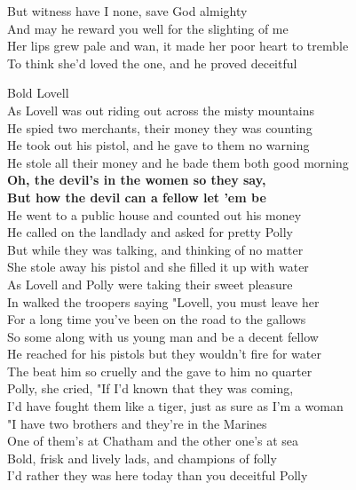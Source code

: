 \documentclass[letterpaper,9pt]{article}
\begin{document}
But witness have I none, save God almighty \\
And may he reward you well for the slighting of me \\
Her lips grew pale and wan, it made her poor heart to tremble \\
To think she'd loved the one, and he proved deceitful \\

\newpage
{}
\Huge
Bold Lovell\\

\Large
As Lovell was out riding out across the misty mountains \\
He spied two merchants, their money they was counting \\
He took out his pistol, and he gave to them no warning \\
He stole all their money and he bade them both good morning \\ 

\textbf {Oh, the devil's in the women so they say, \\
But how the devil can a fellow let 'em be} \\

He went to a public house and counted out his money \\
He called on the landlady and asked for pretty Polly \\
But while they was talking, and thinking of no matter \\
She stole away his pistol and she filled it up with water \\

As Lovell and Polly were taking their sweet pleasure \\
In walked the troopers saying "Lovell, you must leave her \\
For a long time you've been on the road to the gallows \\
So some along with us young man and be a decent fellow \\

He reached for his pistols but they wouldn't fire for water \\
The beat him so cruelly and the gave to him no quarter \\
Polly, she cried, "If I'd known that they was coming, \\
I'd have fought them like a tiger, just as sure as I'm a woman \\

"I have two brothers and they're in the Marines \\
One of them's at Chatham and the other one's at sea \\
Bold, frisk and lively lads, and champions of folly \\
I'd rather they was here today than you deceitful Polly \\
\end{document}
